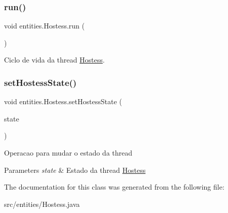 \subsubsection{\texorpdfstring{run()}{run()}}
{\footnotesize\ttfamily void entities.\+Hostess.\+run (\begin{DoxyParamCaption}{ }\end{DoxyParamCaption})\hspace{0.3cm}{\ttfamily [inline]}}

Ciclo de vida da thread \hyperlink{classentities_1_1_hostess}{Hostess}. \mbox{\label{classentities_1_1_hostess_ade5532fba6e9d58853c575ded4006507}} 
\subsubsection{\texorpdfstring{set\+Hostess\+State()}{setHostessState()}}
{\footnotesize\ttfamily void entities.\+Hostess.\+set\+Hostess\+State (\begin{DoxyParamCaption}\item[{\hyperlink{enumentities_1_1_hostess_enum}{Hostess\+Enum}}]{state }\end{DoxyParamCaption})\hspace{0.3cm}{\ttfamily [inline]}}

Operacao para mudar o estado da thread 
\begin{DoxyParams}{Parameters}
{\em state} & Estado da thread \hyperlink{classentities_1_1_hostess}{Hostess} \\
\hline
\end{DoxyParams}


The documentation for this class was generated from the following file\+:\begin{DoxyCompactItemize}
\item 
src/entities/Hostess.\+java\end{DoxyCompactItemize}
